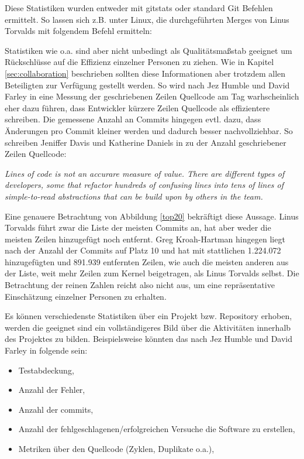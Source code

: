 Diese Statistiken wurden entweder mit gitstats\cite{link:gitstats} oder standard
Git Befehlen ermittelt. So lassen sich z.B. unter Linux, die durchgeführten
Merges von Linus Torvalds mit folgendem Befehl ermitteln:



Statistiken wie o.a. sind aber nicht unbedingt als Qualitätsmaßstab geeignet um
Rückschlüsse auf die Effizienz einzelner Personen zu ziehen. Wie in Kapitel
\ref{sec:collaboration} beschrieben sollten diese Informationen aber trotzdem
allen Beteiligten zur Verfügung gestellt werden.  So wird nach Jez Humble und
David Farley in \cite[S.~138]{cd} eine Messung der geschriebenen Zeilen
Quellcode am Tag warhscheinlich eher dazu führen, dass Entwickler kürzere Zeilen
Quellcode als effizientere schreiben. Die gemessene Anzahl an Commits hingegen
evtl. dazu, dass Änderungen pro Commit kleiner werden und dadurch besser
nachvollziehbar. So schreiben Jeniffer Davis und Katherine Daniels in
\cite[S.~179]{effdo} zu der Anzahl geschriebener Zeilen Quellcode:
\begin{center}
\textit{\glqq{}Lines of code is not an accurare measure of value. There are
different types of developers, some that refactor hundreds of confusing lines
into tens of lines of simple-to-read abstractions that can be build upon by
others in the team.\grqq{}}
\end{center}

Eine genauere Betrachtung von Abbildung \ref{top20} bekräftigt diese Aussage.
Linus Torvalds führt zwar die Liste der meisten Commits an, hat aber weder die
meisten Zeilen hinzugefügt noch entfernt. Greg Kroah-Hartman hingegen liegt
nach der Anzahl der Commits auf Platz 10 und hat mit stattlichen 1.224.072
hinzugefügten und 891.939 entfernten Zeilen, wie auch die meisten anderen aus
der Liste, weit mehr Zeilen zum Kernel beigetragen, als Linus Torvalds selbst.
Die Betrachtung der reinen Zahlen reicht also nicht aus, um eine repräsentative
Einschätzung einzelner Personen zu erhalten.

Es können verschiedenste Statistiken über ein Projekt bzw. Repository erhoben,
werden die geeignet sind ein vollständigeres Bild über die Aktivitäten
innerhalb des Projektes zu bilden. Beispielsweise könnten das nach Jez Humble
und David Farley in \cite[S.~138]{cd}folgende sein:

\begin{itemize}
\item Testabdeckung,
\item Anzahl der Fehler,
\item Anzahl der \glspl{commit},
\item Anzahl der fehlgeschlagenen/erfolgreichen Versuche die Software zu erstellen,
\item Metriken über den Quellcode (Zyklen, Duplikate o.a.),
\end{itemize}

